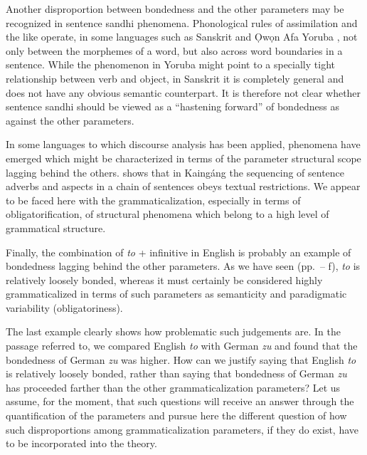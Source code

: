 Another disproportion between bondedness and the other parameters may be recognized in sentence sandhi phenomena. Phonological rules of assimilation and the like operate, in some languages such as Sanskrit and Ọwọn Afa Yoruba \citep[26f]{HeineEtAl1984}, not only between the morphemes of a word, but also across word boundaries in a sentence. While the phenomenon in Yoruba might point to a specially tight relationship between verb and object, in Sanskrit it is completely general and does not have any obvious semantic counterpart. It is therefore not clear whether sentence sandhi should be viewed as a “hastening forward” of bondedness as against the other parameters.

In some languages to which discourse analysis has been applied, phenomena have emerged which might be characterized in terms of the parameter structural scope lagging behind the others. \citet{Wiesemann1980} shows that in Kaingáng the sequencing of sentence adverbs and aspects in a chain of sentences obeys textual restrictions. We appear to be faced here with the grammaticalization, especially in terms of obligatorification, of structural phenomena which belong to a high level of grammatical structure.

Finally, the combination of \textit{to} + infinitive in English is probably an example of bondedness lagging behind the other parameters. As we have seen (pp.~\pageref{page161}--\pageref{page161b}%
f), \textit{to} is relatively loosely bonded, whereas it must certainly be considered highly grammaticalized in terms of such parameters as semanticity and paradigmatic variability (obligatoriness).

The last example clearly shows how problematic such judgements are. In the passage referred to, we compared English \textit{to} with German \textit{zu} and found that the bondedness of German \textit{zu} was higher. How can we justify saying that English \textit{to} is relatively loosely bonded, rather than saying that bondedness of German \textit{zu} has proceeded farther than the other grammaticalization parameters? Let us assume, for the moment, that such questions will receive an answer through the quantification of the parameters and pursue here the different question of how such disproportions among grammaticalization parameters, if they do exist, \enlargethispage{\baselineskip} have to be incorporated into the theory.

